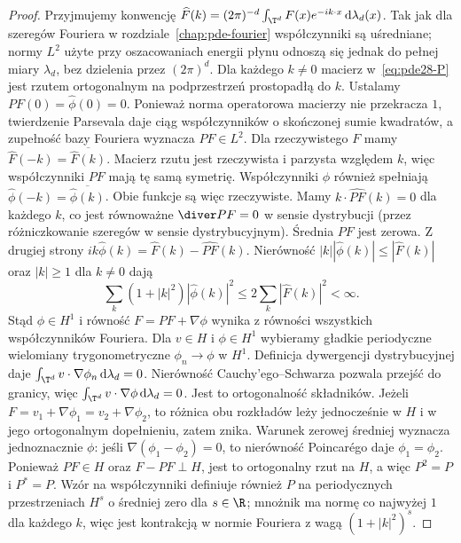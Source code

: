\begin{proof}
Przyjmujemy konwencję $\widehat F(k)=(2\pi)^{-d}
\int_{\T^d}F(x)e^{-ik\cdot x}\,\mathrm d\lambda_d(x)$.
Tak jak dla szeregów Fouriera w rozdziale~\ref{chap:pde-fourier}
współczynniki są uśredniane; normy $L^2$ użyte przy oszacowaniach
energii płynu odnoszą się jednak do pełnej miary $\lambda_d$,
bez dzielenia przez $(2\pi)^d$.
Dla każdego $k\ne0$ macierz w~\eqref{eq:pde28-P} jest rzutem
ortogonalnym na podprzestrzeń prostopadłą do $k$.
Ustalamy $\widehat{PF}(0)=\widehat\phi(0)=0$.
Ponieważ norma operatorowa macierzy nie przekracza $1$,
twierdzenie Parsevala daje ciąg współczynników
o skończonej sumie kwadratów, a zupełność bazy Fouriera
wyznacza $PF\in L^2$. Dla rzeczywistego $F$
mamy $\widehat F(-k)=\overline{\widehat F(k)}$.
Macierz rzutu jest rzeczywista i parzysta względem $k$,
więc współczynniki $PF$ mają tę samą symetrię.
Współczynniki $\phi$ również spełniają
$\widehat\phi(-k)=\overline{\widehat\phi(k)}$.
Obie funkcje są więc rzeczywiste.
Mamy $k\cdot\widehat{PF}(k)=0$ dla każdego $k$,
co jest równoważne $\diver PF=0$ w sensie dystrybucji
(przez różniczkowanie szeregów w sensie dystrybucyjnym).
Średnia $PF$ jest zerowa.
Z drugiej strony $ik\widehat\phi(k)=\widehat F(k)-\widehat{PF}(k)$.
Nierówność $|k||\widehat\phi(k)|\le|\widehat F(k)|$
oraz $|k|\ge1$ dla $k\ne0$ dają
\[
 \sum_k(1+|k|^2)|\widehat\phi(k)|^2
 \le 2\sum_k|\widehat F(k)|^2<\infty.
\]
Stąd $\phi\in H^1$ i równość $F=PF+\nabla\phi$
wynika z równości wszystkich współczynników Fouriera.
Dla $v\in H$ i $\phi\in H^1$ wybieramy gładkie
periodyczne wielomiany trygonometryczne
$\phi_n\to\phi$ w $H^1$. Definicja dywergencji
dystrybucyjnej daje $\int_{\T^d}v\cdot\nabla\phi_n\,
\mathrm d\lambda_d=0$. Nierówność Cauchy'ego--Schwarza
pozwala przejść do granicy, więc
$\int_{\T^d}v\cdot\nabla\phi\,\mathrm d\lambda_d=0$.
Jest to ortogonalność składników. Jeżeli $F=v_1+\nabla\phi_1
=v_2+\nabla\phi_2$, to różnica obu rozkładów leży jednocześnie
w $H$ i w jego ortogonalnym dopełnieniu, zatem znika.
Warunek zerowej średniej wyznacza jednoznacznie $\phi$:
jeśli $\nabla(\phi_1-\phi_2)=0$, to nierówność
Poincarégo daje $\phi_1=\phi_2$.
Ponieważ $PF\in H$ oraz $F-PF\perp H$, jest to
ortogonalny rzut na $H$, a więc $P^2=P$ i $P^*=P$.
Wzór na współczynniki definiuje również $P$ na
periodycznych przestrzeniach $H^s$ o średniej zero
dla $s\in\R$; mnożnik ma normę co najwyżej $1$
dla każdego $k$, więc jest kontrakcją w normie
Fouriera z wagą $(1+|k|^2)^s$.
\end{proof}

